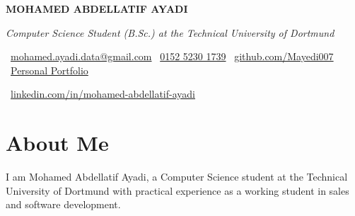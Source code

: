 \documentclass[10pt, letterpaper]{article}
\newenvironment{header}{
    \setlength{\topsep}{0pt}\par\kern\topsep\centering\linespread{1.5}
}{
    \par\kern\topsep
} %
\begin{document}
    \newcommand{\AND}{\unskip
        \cleaders\copy\ANDbox\hskip\wd\ANDbox
        \ignorespaces
    }
    \newsavebox\ANDbox
    \sbox\ANDbox{$|$}

    \begin{header}
   \begin{center}

    \vspace{0.5cm} %
    {\fontsize{20pt}{24pt}\selectfont \textbf{MOHAMED ABDELLATIF AYADI}}
\end{center}
        
\vspace{5 pt}

    \normalsize
    \textit{Computer Science Student (B.Sc.) at the Technical University of Dortmund}

        \vspace{5 pt}

      \faEnvelope\ \href{mailto:mohamed.ayadi.data@gmail.com}{\textcolor{primaryColor}{mohamed.ayadi.data@gmail.com}} \quad
\faPhone\ \href{tel:+49-152-5230-1739}{\textcolor{primaryColor}{0152 5230 1739}} \quad
\faGithub\ \href{https://github.com/Mayedi007}{\textcolor{primaryColor}{github.com/Mayedi007}} \quad
\faGlobe\ \href{https://personal-portfolio-mohamedayadidat.replit.app}{\textcolor{portfolioColor}{Personal Portfolio}} \quad

\faLinkedin\ \href{https://linkedin.com/in/mohamed-abdellatif-ayadi}{\textcolor{primaryColor}{linkedin.com/in/mohamed-abdellatif-ayadi}}

        
        
    \end{header}

    \vspace{1cm}



\section*{About Me}

I am Mohamed Abdellatif Ayadi, a Computer Science student at the Technical University of Dortmund with practical experience as a working student in sales and software development.
\end{document}
